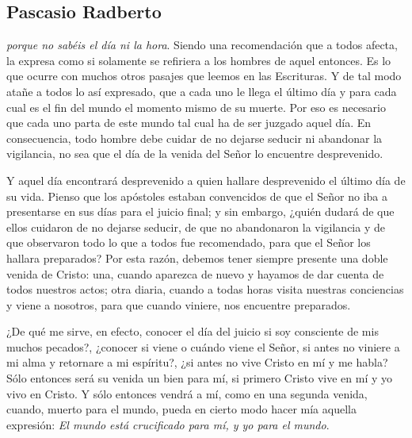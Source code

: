 \subsection{Pascasio Radberto}



\begin{body}
	 \emph{porque no sabéis el día ni la hora}. Siendo una recomendación que a todos afecta, la expresa como si solamente se refiriera a los hombres de aquel entonces. Es lo que ocurre con muchos otros pasajes que leemos en las Escrituras. Y de tal modo atañe a todos lo así expresado, que a cada uno le llega el último día y para cada cual es el fin del mundo el momento mismo de su muerte. Por eso es necesario que cada uno parta de este mundo tal cual ha de ser juzgado aquel día. En consecuencia, todo hombre debe cuidar de no dejarse seducir ni abandonar la vigilancia, no sea que el día de la venida del Señor lo encuentre desprevenido. 
	
	Y aquel día encontrará desprevenido a quien hallare desprevenido el último día de su vida. Pienso que los apóstoles estaban convencidos de que el Señor no iba a presentarse en sus días para el juicio final; y sin embargo, ¿quién dudará de que ellos cuidaron de no dejarse seducir, de que no abandonaron la vigilancia y de que observaron todo lo que a todos fue recomendado, para que el Señor los hallara preparados? Por esta razón, debemos tener siempre presente una doble venida de Cristo: una, cuando aparezca de nuevo y hayamos de dar cuenta de todos nuestros actos; otra diaria, cuando a todas horas visita nuestras conciencias y viene a nosotros, para que cuando viniere, nos encuentre preparados.
	
	¿De qué me sirve, en efecto, conocer el día del juicio si soy consciente de mis muchos pecados?, ¿conocer si viene o cuándo viene el Señor, si antes no viniere a mi alma y retornare a mi espíritu?, ¿si antes no vive Cristo en mí y me habla? Sólo entonces será su venida un bien para mí, si primero Cristo vive en mí y yo vivo en Cristo. Y sólo entonces vendrá a mí, como en una segunda venida, cuando, muerto para el mundo, pueda en cierto modo hacer mía aquella expresión: \emph{El mundo está crucificado para mí, y yo para el mundo}.
	

\end{body}
